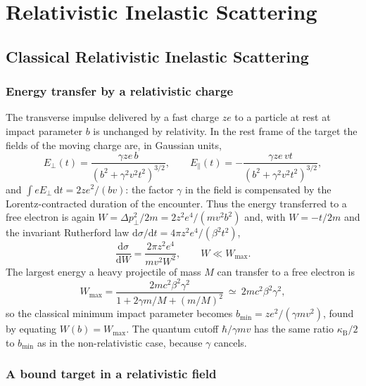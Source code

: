 \documentclass[11pt,a4paper]{book}
\numberwithin{equation}{chapter}
\newcommand{\dd}{\mathrm{d}}
\newcommand{\kB}{\kappa_{\mathrm B}}
\begin{document}
\part{Relativistic Inelastic Scattering}

\chapter{Classical Relativistic Inelastic Scattering}

\section{Energy transfer by a relativistic charge}

The transverse impulse delivered by a fast charge $ze$ to a particle at rest at
impact parameter $b$ is unchanged by relativity. In the rest frame of the target
the fields of the moving charge are, in Gaussian units,
\begin{equation}\label{eq:rel-fields}
  E_\perp(t)=\frac{\gamma ze\,b}{(b^2+\gamma^2v^2t^2)^{3/2}},\qquad
  E_\parallel(t)=-\frac{\gamma ze\,vt}{(b^2+\gamma^2v^2t^2)^{3/2}},
\end{equation}
and $\int eE_\perp\,\dd t=2ze^2/(bv)$: the factor $\gamma$ in the field is
compensated by the Lorentz-contracted duration of the encounter. Thus the
energy transferred to a free electron is again $W=\Delta p_\perp^2/2m=2z^2e^4/(mv^2b^2)$
and, with $W=-t/2m$ and the invariant Rutherford law
$\dd\sigma/\dd t=4\pi z^2e^4/(\beta^2t^2)$,
\begin{equation}\label{eq:rel-dsdW}
  \frac{\dd\sigma}{\dd W}=\frac{2\pi z^2e^4}{mv^2W^2},\qquad W\ll W_{\max}.
\end{equation}
The largest energy a heavy projectile of mass $M$ can transfer to a free electron
is
\begin{equation}\label{eq:Wmax}
  W_{\max}=\frac{2mc^2\beta^2\gamma^2}{1+2\gamma m/M+(m/M)^2}\ \simeq\ 2mc^2\beta^2\gamma^2,
\end{equation}
so the classical minimum impact parameter becomes
$b_{\min}=ze^2/(\gamma mv^2)$, found by equating $W(b)=W_{\max}$. The quantum
cutoff $\hbar/\gamma mv$ has the same ratio $\kB/2$ to $b_{\min}$ as in the
non-relativistic case, because $\gamma$ cancels.

\section{A bound target in a relativistic field}
\end{document}
